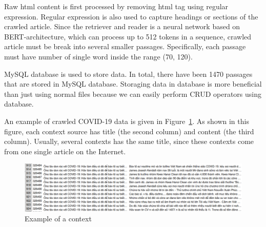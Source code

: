 \documentclass[12pt, sort&compress]{report}
\begin{document}
\par Raw html content is first processed by removing html tag using regular expression. Regular expression is also used to capture headings or sections of the crawled article. Since the retriever and reader is a neural network based on BERT-architecture, which can process up to 512 tokens in a sequence, crawled article must be break into several smaller passages. Specifically, each passage must have number of single word inside the range (70, 120).
\par MySQL database is used to store data. In total, there have been 1470 passages that are stored in MySQL database. Storaging data in database is more beneficial than just using normal files because we can easily perform CRUD operators using database. 
\par An example of crawled COVID-19 data is given in Figure~\ref{fig:09}. As shown in this figure, each context source has title (the second column) and content (the third column). Usually, several contexts has the same title, since these contexts come from one single article on the Internet. 
\begin{figure}
	\centering
	\includegraphics[scale=.5]{images/crawled_data.png}
	\caption{Example of a context}
	\label{fig:09}
\end{figure}
\end{document}
